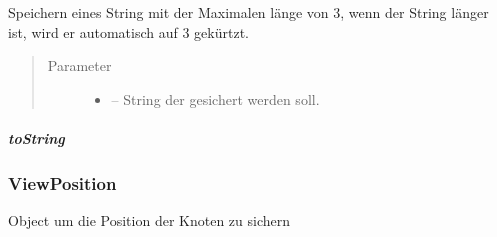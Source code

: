 \documentclass[letterpaper,10pt,ngerman]{sphinxmanual}
\begin{document}
\begin{fulllineitems}
\label{\detokenize{com/linuxluigi/edu/data/NodeData:com.linuxluigi.edu.data.NodeData.setContent(String)}}
Speichern eines String mit der Maximalen länge von 3, wenn der String länger ist, wird er automatisch auf 3 gekürtzt.
\begin{quote}\begin{description}
\item[{Parameter}] \leavevmode\begin{itemize}
\item {} 
 -- String der gesichert werden soll.

\end{itemize}

\end{description}\end{quote}

\end{fulllineitems}



\subparagraph{toString}
\label{\detokenize{com/linuxluigi/edu/data/NodeData:tostring}}

\begin{fulllineitems}
\label{\detokenize{com/linuxluigi/edu/data/NodeData:com.linuxluigi.edu.data.NodeData.toString()}}
\end{fulllineitems}



\subsubsection{ViewPosition}
\label{\detokenize{com/linuxluigi/edu/data/ViewPosition::doc}}\label{\detokenize{com/linuxluigi/edu/data/ViewPosition:viewposition}}

\begin{fulllineitems}
\label{\detokenize{com/linuxluigi/edu/data/ViewPosition:com.linuxluigi.edu.data.ViewPosition}}
Object um die Position der Knoten zu sichern

\end{fulllineitems}
\end{document}
